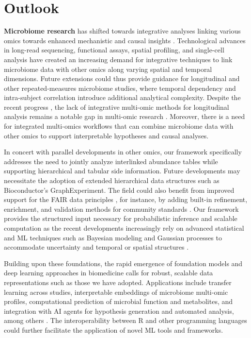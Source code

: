 \documentclass[
  sn-nature,
]{sn-jnl}
\begin{document}
\section{Outlook}\label{sec-discussion}

\textbf{Microbiome research} has shifted towards integrative analyses
linking various omics towards enhanced mechanistic and causal insights
\citep{joos2024, bastiaanssen2023_1}. Technological advances in
long-read sequencing, functional assays, spatial profiling, and
single-cell analysis have created an increasing demand for integrative
techniques to link microbiome data with other omics along varying
spatial and temporal dimensions. Future extensions could thus provide
guidance for longitudinal and other repeated-measures microbiome
studies, where temporal dependency and intra-subject correlation
introduce additional analytical complexity. Despite the recent progress
\citep{martino2021, shi2024}, the lack of integrative multi-omic methods
for longitudinal analysis remains a notable gap in multi-omic research
\citep{sherwani2025}. Moreover, there is a need for integrated
multi-omics workflows that can combine microbiome data with other omics
to support interpretable hypotheses and causal analyses.

In concert with parallel developments in other omics, our framework
specifically addresses the need to jointly analyze interlinked abundance
tables while supporting hierarchical and tabular side information.
Future developments may necessitate the adoption of extended
hierarchical data structures such as Bioconductor's GraphExperiment. The
field could also benefit from improved support for the FAIR data
principles \citep{wilkinson2016}, for instance, by adding built-in
refinement, enrichment, and validation methods for community standards
\citep{field2008, mirzayi2021, kelliher2025}. Our framework provides the
structured input necessary for probabilistic inference and scalable
computation as the recent developments increasingly rely on advanced
statistical and ML techniques such as Bayesian modeling and Gaussian
processes to accommodate uncertainty and temporal or spatial structures
\citep{jeganathan2021, moreno-indias2021}.

Building upon these foundations, the rapid emergence of foundation
models and deep learning approaches in biomedicine calls for robust,
scalable data representations such as those we have adopted.
Applications include transfer learning across studies, interpretable
embeddings of microbiome multi-omic profiles, computational prediction
of microbial function and metabolites, and integration with AI agents
for hypothesis generation and automated analysis, among others
\citep{delia2023}. The interoperability between R and other programming
languages could further facilitate the application of novel ML tools and
frameworks.
\end{document}
